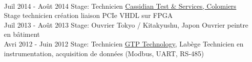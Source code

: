 \documentclass[letterpaper]{twentysecondcv} %
\begin{document}
\begin{twenty}
{  }
  \\
  \twentyitem
  {Juil 2014 -}
  {Août 2014}
  {Stage: Technicien}
  {\href{http://www.spherea.com/fr}{Cassidian Test \& Services, Colomiers}}
  {
    Stage technicien création liaison PCIe VHDL sur FPGA
  }
  \\
  \twentyitem
  {Juil 2013 -}
  {Août 2013}
  {Stage: Ouvrier}
  {Tokyo / Kitakyushu, Japon}
  {
    Ouvrier peintre en bâtiment
  }
  \\
  \twentyitem
  {Avri 2012 -}
  {Juin 2012}
  {Stage: Technicien}
  {\href{https://www.gtptech.com/}{GTP Technology}, Labège}
  {
    Technicien en instrumentation, acquisition de données (Modbus, UART, RS-485)
  }  
\end{twenty}
\end{document}
